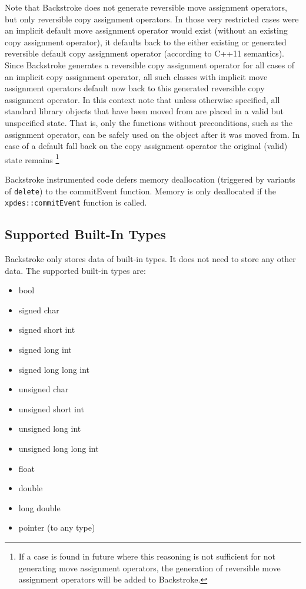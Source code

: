 \documentclass[english,12pt, titlepage]{article}      %
\begin{document}
Note that Backstroke does not generate reversible move assignment
operators, but only reversible copy assignment operators. In those
very restricted cases were an implicit default move assignment
operator would exist (without an existing copy assignment operator),
it defaults back to the either existing or generated reversible
default copy assignment operator (according to C++11 semantics). Since
Backstroke generates a reversible copy assignment operator for all
cases of an implicit copy assignment operator, all such classes with
implicit move assignment operators default now back to this generated
reversible copy assignment operator. In this context note that unless
otherwise specified, all standard library objects that have been moved
from are placed in a valid but unspecified state. That is, only the
functions without preconditions, such as the assignment operator, can
be safely used on the object after it was moved from. In case of a
default fall back on the copy assignment operator the original (valid)
state remains \footnote{If a case is found in future where this
  reasoning is not sufficient for not generating move assignment
  operators, the generation of reversible move assignment operators
  will be added to Backstroke.}

Backstroke instrumented code defers memory deallocation (triggered by
variants of \verb+delete+) to the commitEvent function. Memory is only deallocated
if the \verb+xpdes::commitEvent+ function is called.

\subsection{Supported Built-In Types}

Backstroke only stores data of built-in types. It does not need to
store any other data. The supported built-in types are:

\begin{itemize}
\item bool
\item signed char
\item signed short int
\item signed long int
\item signed long long int
\item unsigned char
\item unsigned short int
\item unsigned long int
\item unsigned long long int
\item float
\item double
\item long double
\item pointer (to any type)
\end{itemize}
\end{document}
